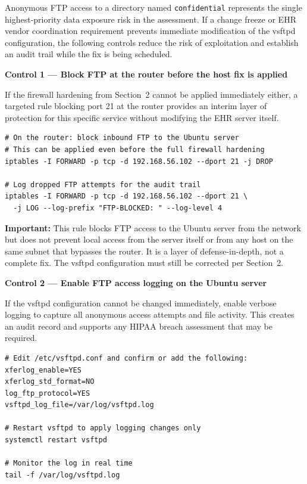 \documentclass[12pt]{article}
\begin{document}
Anonymous FTP access to a directory named \texttt{confidential} represents
the single highest-priority data exposure risk in the assessment. If a
change freeze or EHR vendor coordination requirement prevents immediate
modification of the vsftpd configuration, the following controls reduce the
risk of exploitation and establish an audit trail while the fix is being
scheduled.
 
\bigskip
\noindent\textbf{Control 1 --- Block FTP at the router before the host fix is applied}
 
If the firewall hardening from Section~2 cannot be applied immediately either,
a targeted rule blocking port 21 at the router provides an interim layer of
protection for this specific service without modifying the EHR server itself.
 
\begin{lstlisting}[style=terminal]
# On the router: block inbound FTP to the Ubuntu server
# This can be applied even before the full firewall hardening
iptables -I FORWARD -p tcp -d 192.168.56.102 --dport 21 -j DROP
 
# Log dropped FTP attempts for the audit trail
iptables -I FORWARD -p tcp -d 192.168.56.102 --dport 21 \
  -j LOG --log-prefix "FTP-BLOCKED: " --log-level 4
\end{lstlisting}
 
\begin{warnbox}
\textbf{Important:} This rule blocks FTP access to the Ubuntu server from the
network but does not prevent local access from the server itself or from
any host on the same subnet that bypasses the router. It is a layer of
defense-in-depth, not a complete fix. The vsftpd configuration must still
be corrected per Section~2.
\end{warnbox}
 
\bigskip
\noindent\textbf{Control 2 --- Enable FTP access logging on the Ubuntu server}
 
If the vsftpd configuration cannot be changed immediately, enable verbose
logging to capture all anonymous access attempts and file activity. This
creates an audit record and supports any HIPAA breach assessment that may
be required.
 
\begin{lstlisting}[style=terminal]
# Edit /etc/vsftpd.conf and confirm or add the following:
xferlog_enable=YES
xferlog_std_format=NO
log_ftp_protocol=YES
vsftpd_log_file=/var/log/vsftpd.log
 
# Restart vsftpd to apply logging changes only
systemctl restart vsftpd
 
# Monitor the log in real time
tail -f /var/log/vsftpd.log
\end{lstlisting}
 
\end{document}
